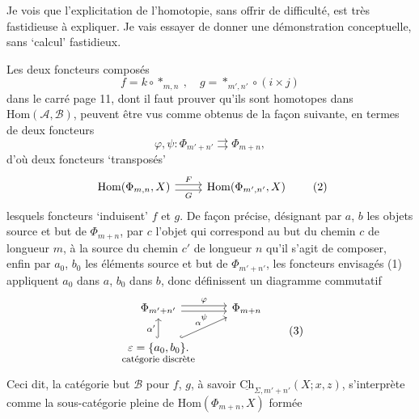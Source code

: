 \documentclass[11pt]{article}
\newcommand{\printedpage}[1]{\marginpar{\footnotesize p.~#1}}
\newcommand{\msp}[1]{\marginpar{\footnotesize [#1]}}
\newcommand{\Hom}{\mathrm{Hom}}
\newcommand{\Ch}{\underline{\mathrm{Ch}}}
\begin{document}
Je vois que l'explicitation de l'homotopie, sans offrir de difficulté, est très fastidieuse à expliquer. Je vais essayer de donner une démonstration conceptuelle, sans `calcul' fastidieux.


\printedpage{10}

\msp{page 15}
Les deux foncteurs composés
\[
f=k\circ *_{m,n}\ ,\quad g=*_{m',n'}\circ(i\times j)
\]
dans le carré page 11, dont il faut prouver qu'ils sont homotopes dans $\Hom(\mathcal{A},\mathcal{B})$, peuvent être vus comme obtenus de la façon suivante, en termes de deux foncteurs
\[
\varphi,\psi:\Phi_{m'+n'}\rightrightarrows\Phi_{m+n}, \tag*{(1)}
\]
d'où deux foncteurs `transposés'
\[
\begin{tikzcd}
\Hom(\Phi_{m,n},X) \arrow[r,shift left,"F"] \arrow[r,shift right,"G"'] & \Hom(\Phi_{m',n'},X)
\end{tikzcd} \tag*{(2)}
\]
 lesquels foncteurs `induisent' $f$ et $g$. De façon précise, désignant par $a$, $b$ les objets source et but de $\Phi_{m+n}$, par $c$ l'objet qui correspond au but du chemin $c$ de longueur $m$, à la source du chemin $c'$ de longueur $n$ qu'il s'agit de composer, enfin par $a_0$, $b_0$ les éléments source et but de $\Phi_{m'+n'}$, les foncteurs envisagés (1) appliquent $a_0$ dans $a$, $b_0$ dans $b$, donc définissent un diagramme commutatif
\[
\begin{tikzcd}
\Phi_{m'+n'} \arrow[r,shift left,"\varphi"] \arrow[r,shift right,"\psi"'] & \Phi_{m+n} \\
\underset{\text{\footnotesize catégorie discrète}}{\varepsilon=\{a_0,b_0\}.} \arrow[u,hook,"\alpha'"] \arrow[ur,hook,"\alpha"] &
\end{tikzcd} \tag*{(3)}
\]
Ceci dit, la catégorie but $\mathcal{B}$ pour $f$, $g$, à savoir $\Ch_{\Sigma,m'+n'}(X;x,z)$, s'interprète comme la sous-catégorie pleine de $\Hom(\Phi_{m+n},X)$ formée
\end{document}
